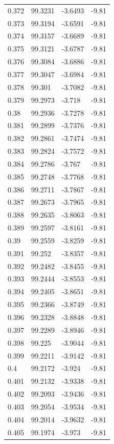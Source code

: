 \begin{tabular}{llll}
0.372 & 99.3231 & -3.6493 & -9.81 \\
0.373 & 99.3194 & -3.6591 & -9.81 \\
0.374 & 99.3157 & -3.6689 & -9.81 \\
0.375 & 99.3121 & -3.6787 & -9.81 \\
0.376 & 99.3084 & -3.6886 & -9.81 \\
0.377 & 99.3047 & -3.6984 & -9.81 \\
0.378 & 99.301 & -3.7082 & -9.81 \\
0.379 & 99.2973 & -3.718 & -9.81 \\
0.38 & 99.2936 & -3.7278 & -9.81 \\
0.381 & 99.2899 & -3.7376 & -9.81 \\
0.382 & 99.2861 & -3.7474 & -9.81 \\
0.383 & 99.2824 & -3.7572 & -9.81 \\
0.384 & 99.2786 & -3.767 & -9.81 \\
0.385 & 99.2748 & -3.7768 & -9.81 \\
0.386 & 99.2711 & -3.7867 & -9.81 \\
0.387 & 99.2673 & -3.7965 & -9.81 \\
0.388 & 99.2635 & -3.8063 & -9.81 \\
0.389 & 99.2597 & -3.8161 & -9.81 \\
0.39 & 99.2559 & -3.8259 & -9.81 \\
0.391 & 99.252 & -3.8357 & -9.81 \\
0.392 & 99.2482 & -3.8455 & -9.81 \\
0.393 & 99.2444 & -3.8553 & -9.81 \\
0.394 & 99.2405 & -3.8651 & -9.81 \\
0.395 & 99.2366 & -3.8749 & -9.81 \\
0.396 & 99.2328 & -3.8848 & -9.81 \\
0.397 & 99.2289 & -3.8946 & -9.81 \\
0.398 & 99.225 & -3.9044 & -9.81 \\
0.399 & 99.2211 & -3.9142 & -9.81 \\
0.4 & 99.2172 & -3.924 & -9.81 \\
0.401 & 99.2132 & -3.9338 & -9.81 \\
0.402 & 99.2093 & -3.9436 & -9.81 \\
0.403 & 99.2054 & -3.9534 & -9.81 \\
0.404 & 99.2014 & -3.9632 & -9.81 \\
0.405 & 99.1974 & -3.973 & -9.81 \\

\end{tabular}
